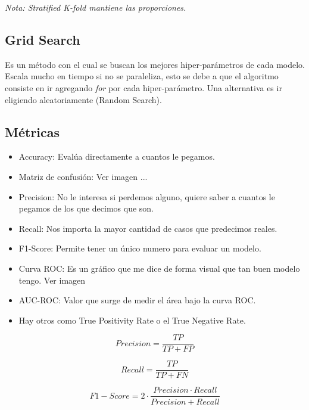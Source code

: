 \documentclass[titlepage,a4paper]{article}
\begin{document}
\textit{Nota: Stratified K-fold mantiene las proporciones.}

\subsection{Grid Search}

Es un método con el cual se buscan los mejores hiper-parámetros de cada modelo. Escala mucho en tiempo si no se paraleliza, esto se debe a que el algoritmo consiste en ir agregando \textit{for} por cada hiper-parámetro. Una alternativa es ir eligiendo aleatoriamente (Random Search).


\subsection{Métricas}
\begin{itemize}
    \item Accuracy: Evalúa directamente a cuantos le pegamos.
    \item Matriz de confusión: Ver imagen ... %
    \item Precision: No le interesa si perdemos alguno, quiere saber a cuantos le pegamos de los que decimos que son. 
    \item Recall: Nos importa la mayor cantidad de casos que predecimos reales.
    \item F1-Score: Permite tener un único numero para evaluar un modelo.
    \item Curva ROC: Es un gráfico que me dice de forma visual que tan buen modelo tengo. Ver imagen %
    \item AUC-ROC: Valor que surge de medir el área bajo la curva ROC.
    \item Hay otros como True Positivity Rate o el True Negative Rate.
\end{itemize}


\begin{equation}
    Precision = \frac{TP}{TP+FP}
\end{equation}


\begin{equation}
    Recall = \frac{TP}{TP+FN}
\end{equation}

\begin{equation}
    F1-Score = 2 \cdot \frac{Precision \cdot Recall}{Precision + Recall}
\end{equation}
\end{document}
